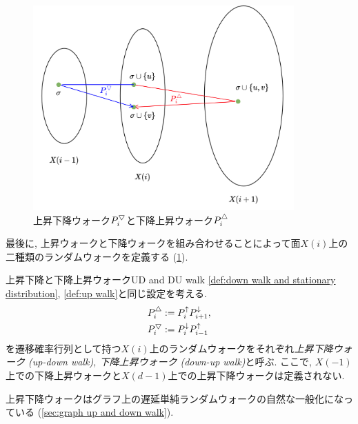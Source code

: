 \begin{figure}
    \begin{center}
    \includegraphics[width=10cm]{images/walks.png}
    \caption{上昇下降ウォーク$P^{\bigtriangledown}_i$と下降上昇ウォーク$P^{\triangle}_i$ \label{fig:walks}}
    \end{center}
\end{figure}
最後に, 上昇ウォークと下降ウォークを組み合わせることによって面$X(i)$上の二種類のランダムウォークを定義する (\cref{fig:walks}).
\begin{definition}{上昇下降と下降上昇ウォーク}{UD and DU walk}
    \cref{def:down walk and stationary distribution}, \ref{def:up walk}と同じ設定を考える.
    \begin{align*}
        &P^{\triangle}_i \mathrel{:=}  P^{\uparrow}_i P^{\downarrow}_{i+1},\\
        &P^{\bigtriangledown}_i \mathrel{:=} P^{\downarrow}_{i}P^{\uparrow}_{i-1}
    \end{align*}
    を遷移確率行列として持つ$X(i)$上のランダムウォークをそれぞれ\emph{上昇下降ウォーク (up-down walk), 下降上昇ウォーク (down-up walk)}と呼ぶ.
    ここで, $X(-1)$上での下降上昇ウォークと$X(d-1)$上での上昇下降ウォークは定義されない.
\end{definition}
上昇下降ウォークはグラフ上の遅延単純ランダムウォークの自然な一般化になっている (\cref{sec:graph up and down walk}).

